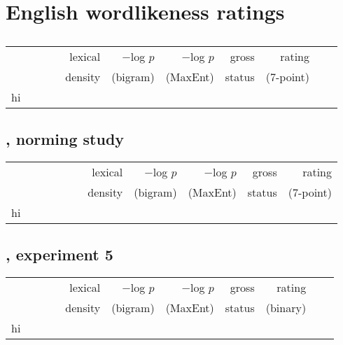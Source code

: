 \chapter{English wordlikeness ratings} 
\label{ratings}

\section{\citet{Albright2007}}

\begin{longtable}{l@{ }l@{ }l@{ }lrrrrrrr}
\toprule
   &   &    &    & lexical & $-$log $p$ & $-$log $p$ & gross  & rating    \\
   &   &    &    & density & (bigram)   & (MaxEnt)   & status & (7-point) \\
\midrule
hi \\
\bottomrule
\end{longtable}

\section{\citet{Albright2003b}, norming study} 

\begin{longtable}{l@{ }l@{ }l@{ }lrrrrrrr}
\toprule
   &    &    &    &    &   & lexical & $-$log $p$ & $-$log $p$ & gross  & rating    \\
   &    &    &    &    &   & density & (bigram)   & (MaxEnt)   & status & (7-point) \\
\midrule
hi \\
\bottomrule
\end{longtable}

\section{\citet{Scholes1966}, experiment 5}    

\begin{longtable}{l@{ }l@{ }l@{ }lrrrrrrr}
\toprule
  &   &    &     & lexical & $-$log $p$ & $-$log $p$ & gross  & rating   \\
  &   &    &     & density & (bigram)   & (MaxEnt)   & status & (binary) \\
\midrule 
hi \\
\bottomrule
\end{longtable}

